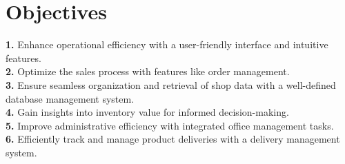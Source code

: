 \section{Objectives}
\textbf{1.} Enhance operational efficiency with a user-friendly interface and intuitive features.\\
\textbf{2.} Optimize the sales process with features like order management.\\
\textbf{3.} Ensure seamless organization and retrieval of shop data with a well-defined database management system.\\
\textbf{4.} Gain insights into inventory value for informed decision-making.\\
\textbf{5.} Improve administrative efficiency with integrated office management tasks.\\
\textbf{6.} Efficiently track and manage product deliveries with a delivery management system.\\




